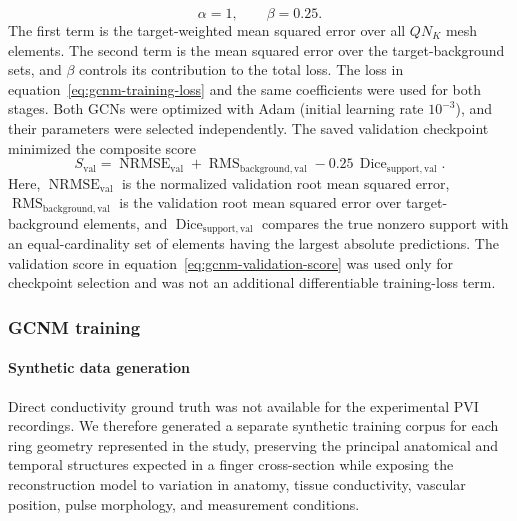 \documentclass[11pt]{article}
\begin{document}
\endgroup
\begin{equation*}
    \alpha=1,
    \qquad
    \beta=0.25.
\end{equation*}
The first term is the target-weighted mean squared error over all $QN_K$ mesh elements.
The second term is the mean squared error over the target-background sets, and $\beta$ controls its contribution to the total loss.
The loss in equation~\eqref{eq:gcnm-training-loss} and the same coefficients were used for both stages.
Both GCNs were optimized with Adam (initial learning rate $10^{-3}$), and their parameters were selected independently.
The saved validation checkpoint minimized the composite score
\begin{equation}
    S_{\mathrm{val}}
    =
    \operatorname{NRMSE}_{\mathrm{val}}
    +
    \operatorname{RMS}_{\mathrm{background,val}}
    -
    0.25\,\operatorname{Dice}_{\mathrm{support,val}}.
\label{eq:gcnm-validation-score}
\end{equation}
Here, $\operatorname{NRMSE}_{\mathrm{val}}$ is the normalized validation root mean squared error, $\operatorname{RMS}_{\mathrm{background,val}}$ is the validation root mean squared error over target-background elements, and $\operatorname{Dice}_{\mathrm{support,val}}$ compares the true nonzero support with an equal-cardinality set of elements having the largest absolute predictions.
The validation score in equation~\eqref{eq:gcnm-validation-score} was used only for checkpoint selection and was not an additional differentiable training-loss term.

\subsubsection{GCNM training}
\label{sec:gcnm-training}

\begingroup

\paragraph{Synthetic data generation}
\label{sec:gcnm-synthetic-data}
\mbox{}\par

Direct conductivity ground truth was not available for the experimental PVI recordings.
We therefore generated a separate synthetic training corpus for each ring geometry represented in the study, preserving the principal anatomical and temporal structures expected in a finger cross-section while exposing the reconstruction model to variation in anatomy, tissue conductivity, vascular position, pulse morphology, and measurement conditions.
\end{document}
